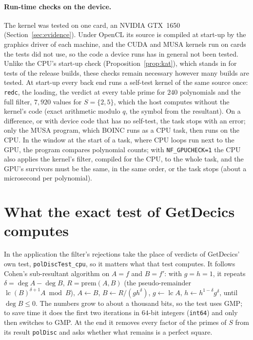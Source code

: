 \documentclass[10pt,a4paper]{article}
\DeclareMathOperator{\lc}{lc}
\newcommand{\code}[1]{\texttt{#1}}
\theoremstyle{plain}
\theoremstyle{definition}
\begin{document}
\paragraph{Run-time checks on the device.}  The kernel was tested on one card, an NVIDIA GTX~1650 (Section~\ref{sec:evidence}).  Under OpenCL its source is
compiled at start-up by the graphics driver of each machine, and the CUDA and MUSA kernels run on cards the tests did not use, so the code a device runs has in
general not been tested.  Unlike the CPU's start-up check (Proposition~\ref{prop:kat}), which stands in for tests of the release builds, these checks remain
necessary however many builds are tested.  At start-up every back end runs a self-test kernel of the same source once: \code{redc}, the loading, the verdict at
every table prime for $240$ polynomials and the full filter, $7{,}920$ values for $S=\{2,5\}$, which the host computes without the kernel's code (exact arithmetic
modulo $q$, the symbol from the resultant).  On a difference, or with device code that has no self-test, the task stops with an error; only the MUSA program,
which BOINC runs as a CPU task, then runs on the CPU.  In the window at the start of a
task, where CPU loops run next to the GPU, the program compares polynomial counts; with \code{NF\_GPUCHECK=1} the CPU also applies the kernel's filter, compiled for
the CPU, to the whole task, and the GPU's survivors must be the same, in the same order, or the task stops (about a microsecond per polynomial).

\section{What the exact test of GetDecics computes}\label{sec:poldisc}

In the application the filter's rejections take the place of verdicts of GetDecics' own test, \code{polDiscTest\_cpu}, so it matters what that test computes.
It follows Cohen's sub-resultant algorithm \cite[Algorithm~3.3.7]{cohen} on $A=f$ and $B=f'$: with $g=h=1$, it repeats $\delta=\deg A-\deg B$,
$R=\mathrm{prem}(A,B)$ (the pseudo-remainder $\lc(B)^{\delta+1}A\bmod B$), $A\leftarrow B$, $B\leftarrow R/(gh^\delta)$, $g\leftarrow\lc A$,
$h\leftarrow h^{1-\delta}g^\delta$, until $\deg B\le0$.  The numbers grow to about a thousand bits, so the test uses GMP; to save time it does the first two
iterations in $64$-bit integers (\code{int64}) and only then switches to GMP.  At the end it removes every factor of the primes of $S$ from its result \code{polDisc}
and asks whether what remains is a perfect square.
\end{document}
